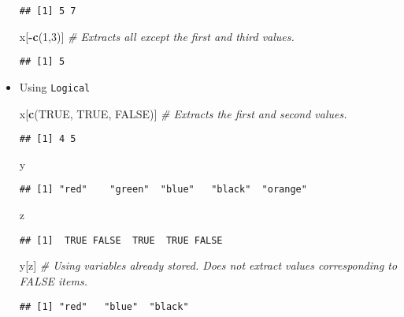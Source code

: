 \documentclass[
]{book}
\newenvironment{Shaded}{\begin{snugshade}}{\end{snugshade}}
\newcommand{\CommentTok}[1]{\textcolor[rgb]{0.56,0.35,0.01}{\textit{#1}}}
\newcommand{\DecValTok}[1]{\textcolor[rgb]{0.00,0.00,0.81}{#1}}
\newcommand{\KeywordTok}[1]{\textcolor[rgb]{0.13,0.29,0.53}{\textbf{#1}}}
\newcommand{\NormalTok}[1]{#1}
\newcommand{\OperatorTok}[1]{\textcolor[rgb]{0.81,0.36,0.00}{\textbf{#1}}}
\newcommand{\OtherTok}[1]{\textcolor[rgb]{0.56,0.35,0.01}{#1}}
\begin{document}
\begin{itemize}
\begin{verbatim}
## [1] 5 7
\end{verbatim}

\begin{Shaded}
\begin{Highlighting}[]
\NormalTok{x[}\OperatorTok{-}\KeywordTok{c}\NormalTok{(}\DecValTok{1}\NormalTok{,}\DecValTok{3}\NormalTok{)] }\CommentTok{# Extracts all except the first and third values.}
\end{Highlighting}
\end{Shaded}

\begin{verbatim}
## [1] 5
\end{verbatim}
\item
  Using \texttt{Logical}

\begin{Shaded}
\begin{Highlighting}[]
\NormalTok{x[}\KeywordTok{c}\NormalTok{(}\OtherTok{TRUE}\NormalTok{, }\OtherTok{TRUE}\NormalTok{, }\OtherTok{FALSE}\NormalTok{)] }\CommentTok{# Extracts the first and second values.}
\end{Highlighting}
\end{Shaded}

\begin{verbatim}
## [1] 4 5
\end{verbatim}

\begin{Shaded}
\begin{Highlighting}[]
\NormalTok{y}
\end{Highlighting}
\end{Shaded}

\begin{verbatim}
## [1] "red"    "green"  "blue"   "black"  "orange"
\end{verbatim}

\begin{Shaded}
\begin{Highlighting}[]
\NormalTok{z}
\end{Highlighting}
\end{Shaded}

\begin{verbatim}
## [1]  TRUE FALSE  TRUE  TRUE FALSE
\end{verbatim}

\begin{Shaded}
\begin{Highlighting}[]
\NormalTok{y[z] }\CommentTok{# Using variables already stored. Does not extract values corresponding to FALSE items. }
\end{Highlighting}
\end{Shaded}

\begin{verbatim}
## [1] "red"   "blue"  "black"
\end{verbatim}
\end{itemize}
\end{document}
